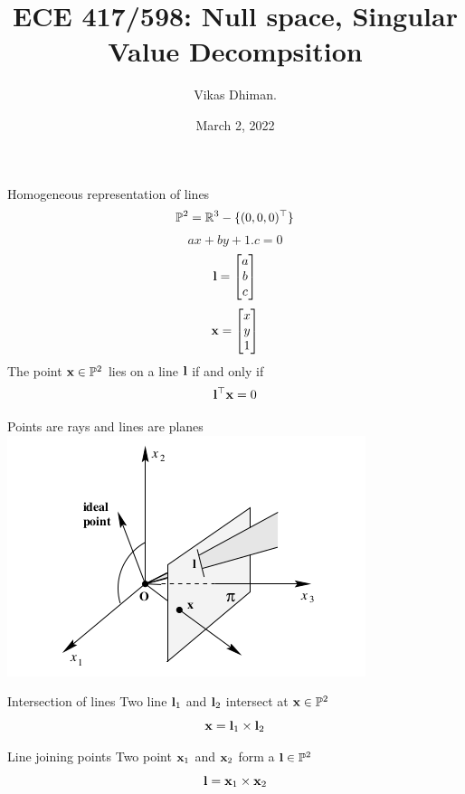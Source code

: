 \documentclass[times,t]{beamer}
\title{ECE 417/598: Null space, Singular Value Decompsition }
\author{Vikas Dhiman.  }
\date{March 2, 2022}
\begin{document}
\begin{frame}
  \titlepage
  \end{frame}

  \begin{frame}{Homogeneous representation of lines}
    \[ \mathbb{P}^2 = \mathbb{R}^3 - \{  (0, 0, 0)^\top \}   \]
    \[ ax + by + 1.c = 0\]
    \[ \mathbf{l} = \begin{bmatrix}
        a \\ b \\ c
        \end{bmatrix} \]
      \[ \mathbf{x} = \begin{bmatrix}
          x \\ y \\ 1
        \end{bmatrix} \]
      The point $\mathbf{x} \in \mathbb{P}^2$ lies on a line $\mathbf{l}$ if and only if
      \[ \mathbf{l}^\top \mathbf{x} = 0 \]
    \end{frame}

\begin{frame}{Points are rays and  lines are  planes}
  \includegraphics[width=\linewidth]{media/projective-plane-points-are-rays-and-lines-are-planes.png}
\end{frame}

\begin{frame}{Intersection of lines}
  Two line $\mathbf{l}_1$ and $\mathbf{l}_2$ intersect at $\mathbf{x}\in \mathbb{P}^2$
  \[ \mathbf{x} = \mathbf{l}_1 \times \mathbf{l}_2 \]
\end{frame}

\begin{frame}{Line joining  points}
  Two point $\mathbf{x}_1$ and $\mathbf{x}_2$ form a $\mathbf{l} \in \mathbb{P}^2$
  \[ \mathbf{l} = \mathbf{x}_1 \times \mathbf{x}_2 \]
\end{frame}
\end{document}
